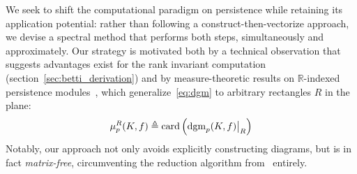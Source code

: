\documentclass[10pt]{article}
\numberwithin{equation}{section}
\newcommand{\+}{%
	\raisebox{0.18ex}{\scaleobj{0.55}{+}}
}
\newcommand\restr[2]{{%
  \left.\kern-\nulldelimiterspace %
  #1 %
  \vphantom{\big|} %
  \right|_{#2} %
  }}
\theoremstyle{definition}
\theoremstyle{definition}
\begin{document}


We seek to shift the computational paradigm on persistence while retaining its application potential: 
rather than following a construct-then-vectorize approach,
we devise a spectral method 
that performs both steps, simultaneously and approximately. 
Our strategy is motivated both by a technical observation that suggests advantages exist for the rank invariant computation (section~\ref{sec:betti_derivation}) and by measure-theoretic results on $\mathbb{R}$-indexed persistence modules~\cite{cerri2013betti, chazal2016structure}, which generalize~\eqref{eq:dgm} to arbitrary rectangles $R$ in the plane:
\begin{equation}\label{eq:measure}
\mu_p^R(K, f) \triangleq \mathrm{card}\left(\restr{\mathrm{dgm}_p(K, f)}{R} \right) 
% 
\end{equation}
Notably, our approach not only avoids explicitly constructing diagrams, but is in fact \emph{matrix-free}, circumventing the reduction algorithm from~\cite{edelsbrunner2022computational} entirely.  
\end{document}
